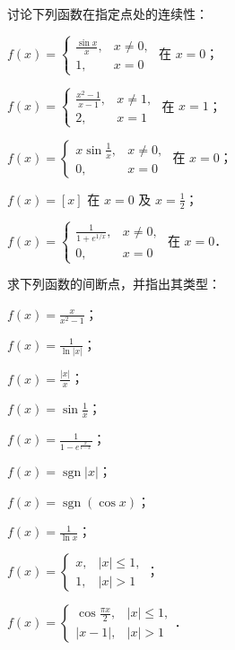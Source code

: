 \begin{xiti}
\item 讨论下列函数在指定点处的连续性：
\begin{ziti}
\item $f(x) = \begin{cases} \frac{\sin x}{x}, & x \neq 0, \\ 1, & x = 0 \end{cases}$ 在 $x = 0$；
\item $f(x) = \begin{cases} \frac{x^2 - 1}{x - 1}, & x \neq 1, \\ 2, & x = 1 \end{cases}$ 在 $x = 1$；
\item $f(x) = \begin{cases} x \sin\frac{1}{x}, & x \neq 0, \\ 0, & x = 0 \end{cases}$ 在 $x = 0$；
\item $f(x) = [x]$ 在 $x = 0$ 及 $x = \frac{1}{2}$；
\item $f(x) = \begin{cases} \frac{1}{1 + e^{1/x}}, & x \neq 0, \\ 0, & x = 0 \end{cases}$ 在 $x = 0$．
\end{ziti}

\item 求下列函数的间断点，并指出其类型：
\begin{ziti}
\item $f(x) = \frac{x}{x^2 - 1}$；
\item $f(x) = \frac{1}{\ln |x|}$；
\item $f(x) = \frac{|x|}{x}$；
\item $f(x) = \sin\frac{1}{x}$；
\item $f(x) = \frac{1}{1 - e^{\frac{x}{1-x}}}$；
\item $f(x) = \operatorname{sgn}|x|$；
\item $f(x) = \operatorname{sgn}(\cos x)$；
\item $f(x) = \frac{1}{\ln x}$；
\item $f(x) = \begin{cases} x, & |x| \leqslant 1, \\ 1, & |x| > 1 \end{cases}$；
\item $f(x) = \begin{cases} \cos\frac{\pi x}{2}, & |x| \leqslant 1, \\ |x - 1|, & |x| > 1 \end{cases}$．
\end{ziti}


\end{xiti}
